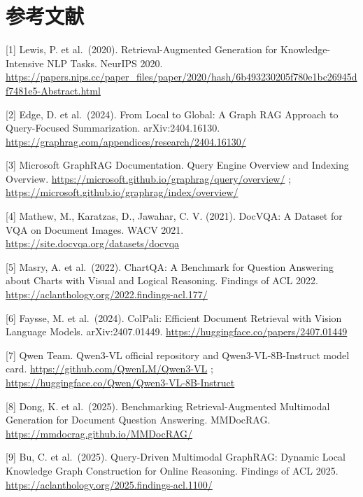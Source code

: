 \chapter{参考文献}\label{ux53c2ux8003ux6587ux732e}

{[}1{]} Lewis, P. et al.~(2020). Retrieval-Augmented Generation for
Knowledge-Intensive NLP Tasks. NeurIPS 2020.
\url{https://papers.nips.cc/paper_files/paper/2020/hash/6b493230205f780e1bc26945df7481e5-Abstract.html}

{[}2{]} Edge, D. et al.~(2024). From Local to Global: A Graph RAG
Approach to Query-Focused Summarization. arXiv:2404.16130.
\url{https://graphrag.com/appendices/research/2404.16130/}

{[}3{]} Microsoft GraphRAG Documentation. Query Engine Overview and
Indexing Overview. \url{https://microsoft.github.io/graphrag/query/overview/}
; \url{https://microsoft.github.io/graphrag/index/overview/}

{[}4{]} Mathew, M., Karatzas, D., Jawahar, C. V. (2021). DocVQA: A
Dataset for VQA on Document Images. WACV 2021.
\url{https://site.docvqa.org/datasets/docvqa}

{[}5{]} Masry, A. et al.~(2022). ChartQA: A Benchmark for Question
Answering about Charts with Visual and Logical Reasoning. Findings of
ACL 2022. \url{https://aclanthology.org/2022.findings-acl.177/}

{[}6{]} Faysse, M. et al.~(2024). ColPali: Efficient Document Retrieval
with Vision Language Models. arXiv:2407.01449.
\url{https://huggingface.co/papers/2407.01449}

{[}7{]} Qwen Team. Qwen3-VL official repository and Qwen3-VL-8B-Instruct
model card. \url{https://github.com/QwenLM/Qwen3-VL} ;
\url{https://huggingface.co/Qwen/Qwen3-VL-8B-Instruct}

{[}8{]} Dong, K. et al.~(2025). Benchmarking Retrieval-Augmented
Multimodal Generation for Document Question Answering. MMDocRAG.
\url{https://mmdocrag.github.io/MMDocRAG/}

{[}9{]} Bu, C. et al.~(2025). Query-Driven Multimodal GraphRAG: Dynamic
Local Knowledge Graph Construction for Online Reasoning. Findings of ACL
2025. \url{https://aclanthology.org/2025.findings-acl.1100/}

